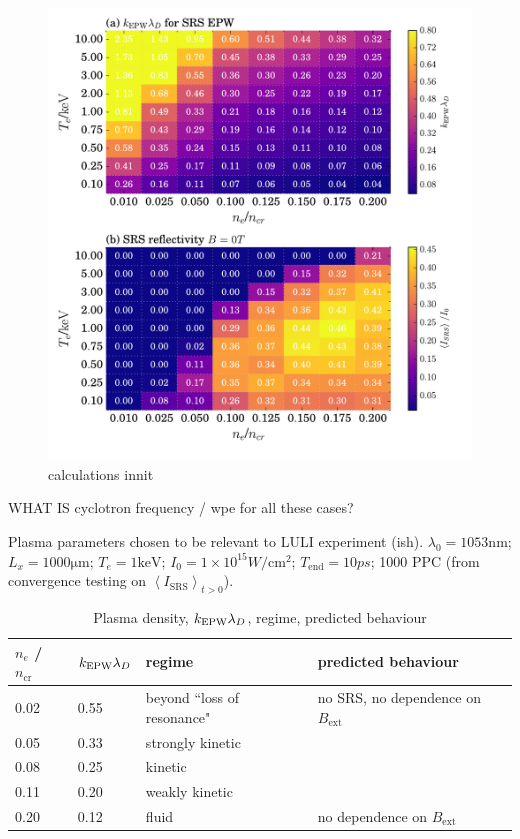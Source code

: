 \begin{figure}[ht]
   \centering
    \includegraphics[width=\columnwidth]{Chapters/C6_magSRS/figa_figb.pdf}
    \caption{calculations innit}
    \label{fig:refl_B0T}
\end{figure}{}

WHAT IS cyclotron frequency / wpe for all these cases?

Plasma parameters chosen to be relevant to LULI experiment (ish). $\lambda_0 = 1053 \si{\nano\metre}$; $L_x = 1000 \si{\micro\metre}$; $T_e = 1 \si{\kilo\electronvolt}$; $I_0 = 1\times 10^{15}\si{W/\cm^2}$; $T_{\mathrm{end}}=10 \si{ps}$; 1000 PPC (from convergence testing on $\left< I_{\mathrm{SRS}} \right>_{t>0}$).

\begin{table}[h]
\begin{center}

\begin{tabular}{|l|l|l|l|}
\hline
$n_e$ / $n_{\mathrm{cr}}$ & $k_\mathrm{EPW}\lambda_D$ & regime & predicted behaviour\\ \hline \hline
0.02 & 0.55 & beyond ``loss of resonance" & no SRS, no dependence on $B_{\mathrm{ext}}$  \\ \hline
0.05 & 0.33 & strongly kinetic &  \\ \hline
0.08 & 0.25 & kinetic &  \\ \hline
0.11 & 0.20 & weakly kinetic & \\ \hline
0.20 & 0.12 & fluid & no dependence on $B_{\mathrm{ext}}$\\ \hline

\end{tabular}

\end{center}
\caption{Plasma density, $k_\mathrm{EPW}\lambda_D$, regime, predicted behaviour}
\label{tab:predictions}
\end{table}

